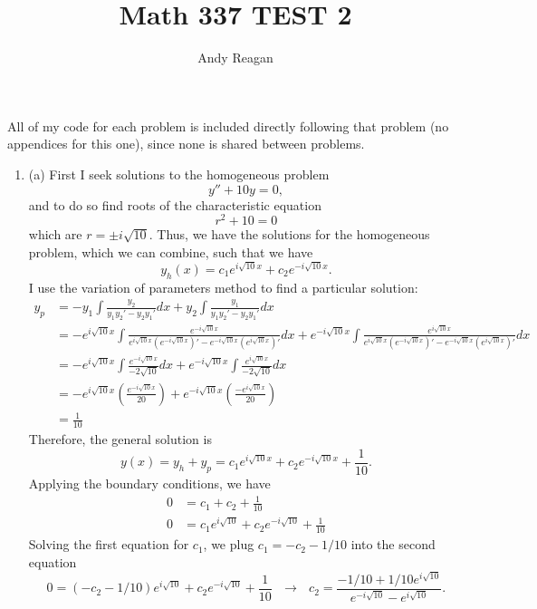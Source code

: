 \documentclass[11pt]{article}
\author{Andy Reagan}
\title{Math 337 TEST 2}
\def\f{\frac }
\begin{document}
\maketitle

All of my code for each problem is included directly following that problem (no appendices for this one), since none is shared between problems.

\begin{enumerate}

\item (a) First I seek solutions to the homogeneous problem
\[ y'' + 10y = 0,\]
and to do so find roots of the characteristic equation
\[ r^2 + 10 = 0\]
which are $r = \pm i \sqrt{10}$.
Thus, we have the solutions for the homogeneous problem, which we can combine, such that we have
\[ y_h (x) = c_1 e^{i \sqrt{10} x } + c_2 e^{-i \sqrt{10} x}. \]
I use the variation of parameters method to find a particular solution:
\begin{align*} y_p &= -y_1 \int \f{y_2}{y_1y_2'-y_2y_1'}dx +y_2 \int \f{y_1}{y_1y_2'-y_2y_1'}dx\\
 &= -e^{i \sqrt{10} x } \int \f{e^{-i \sqrt{10} x }}{e^{i \sqrt{10} x }(e^{-i \sqrt{10} x })'-e^{-i \sqrt{10} x }(e^{i \sqrt{10} x })'}dx +e^{-i \sqrt{10} x } \int \f{e^{i \sqrt{10} x }}{e^{i \sqrt{10} x }(e^{-i \sqrt{10} x })'-e^{-i \sqrt{10} x }(e^{i \sqrt{10} x })'}dx\\
 &= -e^{i \sqrt{10} x } \int \f{e^{-i \sqrt{10} x }}{-2 \sqrt{10}}dx +e^{-i \sqrt{10} x } \int \f{e^{i \sqrt{10} x }}{-2 \sqrt{10}}dx\\
 &= -e^{i \sqrt{10} x } \left ( \f{e^{-i \sqrt{10} x }}{20}\right )  +e^{-i \sqrt{10} x }\left( \f{-e^{i \sqrt{10} x }}{20} \right )\\
 &= \f{1}{10}\end{align*}
Therefore, the general solution is
\[ y(x) = y_h + y_p = c_1 e^{i \sqrt{10} x } + c_2 e^{-i \sqrt{10} x}+\f{1}{10} .\]
Applying the boundary conditions, we have
\begin{align*} 0 &= c_1 + c_2 +\f{1}{10} \\
0 &= c_1 e^{i \sqrt{10} } + c_2 e^{-i \sqrt{10}}+\f{1}{10} \end{align*}
Solving the first equation for $c_1$, we plug $c_1 = -c_2 -1/10$ into the second equation
\[ 0 = (-c_2 -1/10) e^{i \sqrt{10} } + c_2 e^{-i \sqrt{10}}+\f{1}{10}~~~ \rightarrow~~~ c_2 = \f{-1/10 + 1/10 e^{i\sqrt{10}}}{e^{-i\sqrt{10}}-e^{i\sqrt{10}}}. \]


\end{enumerate}
\end{document}
